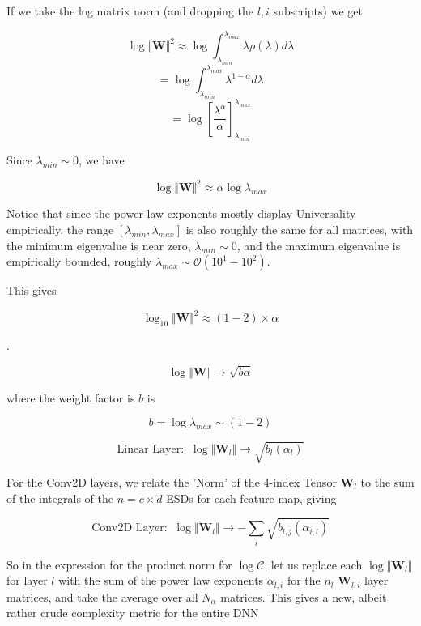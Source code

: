 If we take the log matrix norm (and dropping the $l,i$ subscripts) we get

$$\log\Vert\mathbf{W}\Vert^{2}\approx\log\int_{\lambda_{min}}^{\lambda_{max}}\lambda\rho(\lambda)d\lambda$$
$$=\log\int_{\lambda_{min}}^{\lambda_{max}}\lambda^{1-\alpha}d\lambda$$
$$=\log\left[\dfrac{\lambda^{\alpha}}{\alpha}\right]^{\lambda_{max}}_{\lambda_{min}}$$

Since $\lambda_{min}\sim 0$, we have 

$$\log\Vert\mathbf{W}\Vert^{2}\approx\alpha\log\lambda_{max}$$

Notice that since the power law exponents mostly display Universality empirically, the range $[\lambda_{min},\lambda_{max}]$ is also roughly the same for all matrices, with the minimum eigenvalue is near zero, $\lambda_{min}\sim 0$, and the maximum eigenvalue is  empirically bounded, roughly $\lambda_{max}\sim\mathcal{O}(10^{1}-10^{2})$.  

This gives 

$$\log_{10}\Vert\mathbf{W}\Vert^{2}\approx(1-2)\times\alpha$$



.  

$$\log\Vert\mathbf{W}\Vert\rightarrow \sqrt{b\alpha}$$

where the weight factor is $b$ is 

$$b=\log\lambda_{max}\sim(1-2)$$


$$\text{Linear Layer:}\;\;\log\Vert\mathbf{W}_{l}\Vert\rightarrow\sqrt{b_{l}(\alpha_{l})}$$

For the Conv2D layers, we relate the 'Norm' of the 4-index Tensor $\mathbf{W}_{l}$ to the sum of the integrals of the $n=c\times d$ ESDs for each feature map, giving 

$$\text{Conv2D Layer:}\;\;\log\Vert\mathbf{W}_{l}\Vert\rightarrow-\sum_{i}\sqrt{b_{l,j}(\alpha_{i,l})}$$

So in the expression for the product norm for $\log\mathcal{C}$, let us replace each $\log\Vert\mathbf{W}_{l}\Vert$ for layer $l$ with the sum of the power law exponents $\alpha_{l,i}$ for the $n{_l}$ $\mathbf{W}_{l,i}$ layer matrices, and take the average over all $N_{\alpha}$  matrices.  This gives a new, albeit rather crude complexity metric for the entire DNN

